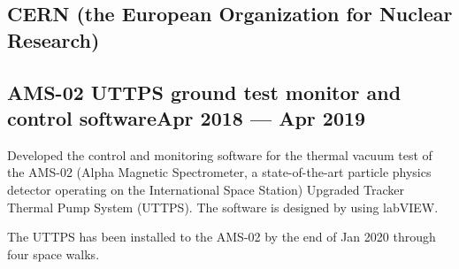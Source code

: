 \documentclass[letter,10pt]{article}
\begin{document}
\subsection{CERN (the European Organization for Nuclear Research)}
\subsection{{AMS-02 UTTPS ground test monitor and control software\hfill Apr 2018 --- Apr 2019}}
\begin{zitemize}
\item Developed the control and monitoring software for the thermal vacuum test of the AMS-02 (Alpha Magnetic Spectrometer, a state-of-the-art particle physics detector operating on the International Space Station) Upgraded Tracker Thermal Pump System (UTTPS). The software is designed by using labVIEW.
\item The UTTPS has been installed to the AMS-02 by the end of Jan 2020 through four space walks.
\end{zitemize}
\end{document}
